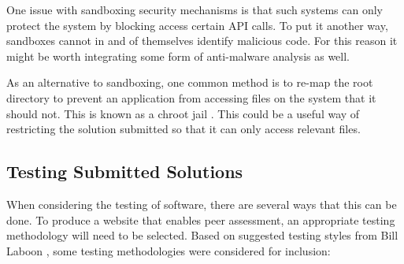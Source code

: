 \documentclass[a4paper,11pt]{report}
\begin{document}
One issue with sandboxing security mechanisms is that such systems can only protect the system by blocking access certain API calls. To put it another way, sandboxes cannot in and of themselves identify malicious code. For this reason it might be worth integrating some form of anti-malware analysis as well.\par
As an alternative to sandboxing, one common method is to re-map the root directory to prevent an application from accessing files on the system that it should not. This is known as a chroot jail \cite{ubuntu_basic_2016}. This could be a useful way of restricting the solution submitted so that it can only access relevant files.

\subsection{Testing Submitted Solutions}
\label{subsec:bgtest}
When considering the testing of software, there are several ways that this can be done. To produce a website that enables peer assessment, an appropriate testing methodology will need to be selected. Based on suggested testing styles from Bill Laboon \cite{laboon_friendly_2016}, some testing methodologies were considered for inclusion:
\end{document}
